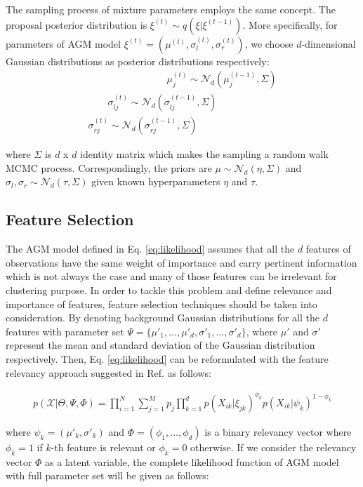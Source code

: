 \documentclass[conference]{IEEEtran}
\begin{document}
The sampling process of mixture parameters employs the same concept. The proposal posterior distribution is  $\xi^{(t)} \sim q(\xi|\xi^{(t-1)})$. More specifically, for parameters of AGM model $\xi^{(t)} = (\mu^{(t)}, \sigma_{l}^{(t)}, \sigma_{r}^{(t)})$, we choose $d$-dimensional Gaussian distributions as posterior distributions respectively:
\begin{multline}
\qquad\qquad\qquad\qquad\mu_j^{(t)} \sim \mathcal{N}_d(\mu_j^{(t-1)},\Sigma) \\
\qquad\sigma_{lj}^{(t)} \sim \mathcal{N}_d(\sigma_{lj}^{(t-1)},\Sigma) \\
\sigma_{rj}^{(t)} \sim \mathcal{N}_d(\sigma_{rj}^{(t-1)},\Sigma)\qquad\qquad\quad
\label{eq:posters}
\end{multline}

where $\Sigma$ is $d$ x $d$ identity matrix which makes the sampling a random walk MCMC process. Correspondingly, the priors are $\mu \sim \mathcal{N}_d(\eta,\Sigma)$ and $\sigma_l, \sigma_r \sim \mathcal{N}_d(\tau,\Sigma)$ given known hyperparameters $\eta$ and $\tau$.

\subsection{Feature Selection}
The AGM model defined in Eq. \eqref{eq:likelihood} assumes that all the $d$ features of observations have the same weight of importance and carry pertinent information which is not always the case and many of those features can be irrelevant for clustering purpose. In order to tackle this problem and define relevance and importance of features, feature selection techniques \cite{Elguebaly2013}\cite{Elguebaly2015a} should be taken into consideration. By denoting background Gaussian distributions for all the $d$ features with parameter set $\Psi = \{\mu'_1,...,\mu'_d, \sigma'_1,...,\sigma'_d\}$, where $\mu'$ and $\sigma'$ represent the mean and standard deviation of the Gaussian distribution respectively. Then, Eq. \eqref{eq:likelihood} can be reformulated with the feature relevancy approach suggested in Ref. \cite{Law2004} as follows:

\begin{align}
p(\mathcal{X}|\Theta,\Psi,\Phi) = \prod_{i=1}^N \sum_{j=1}^Mp_j\prod_{k=1}^dp(X_{ik}|\xi_{jk})^{\phi_k}p(X_{ik}|\psi_{k})^{1-\phi_k}
\label{eq:likelihoodFeature}
\end{align}

where $\psi_k=(\mu'_k,\sigma'_k)$ and $\Phi = (\phi_1,\dots,\phi_d)$ is a binary relevancy vector where $\phi_k=1$ if $k$-th feature is relevant or $\phi_k=0$ otherwise. If we consider the relevancy vector $\Phi$ as a latent variable, the complete likelihood function of AGM model with full parameter set will be given as follows:
\end{document}
